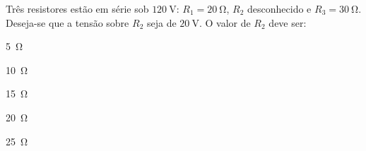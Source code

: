 \begin{questao}[2]{}

Três resistores estão em série sob $\SI{120}{\volt}$: $R_1=\SI{20}{\ohm}$,
$R_2$ desconhecido e $R_3=\SI{30}{\ohm}$. Deseja-se que a tensão sobre $R_2$
seja de $\SI{20}{\volt}$. O valor de $R_2$ deve ser:
\begin{alternativas}[3]
\item \SI{5}{\ohm}
\item \SI{10}{\ohm}
\item \SI{15}{\ohm}
\item \SI{20}{\ohm}
\item \SI{25}{\ohm}
\end{alternativas}


\end{questao}

